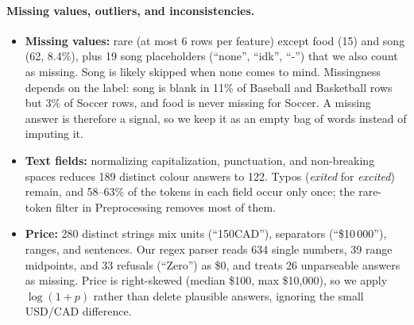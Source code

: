 \documentclass[11pt,letterpaper]{article}
\begin{document}
\paragraph{Missing values, outliers, and inconsistencies.}
\begin{itemize}
\item \textbf{Missing values:} rare (at most 6 rows per feature) except food (15)
and song (62, 8.4\%), plus 19 song placeholders (``none'', ``idk'', ``-'') that we
also count as missing. Song is likely skipped when none comes to mind. Missingness
depends on the label: song is blank in 11\% of Baseball and Basketball rows but 3\%
of Soccer rows, and food is never missing for Soccer. A missing answer is therefore
a signal, so we keep it as an empty bag of words instead of imputing it.
\item \textbf{Text fields:} normalizing capitalization, punctuation, and
non-breaking spaces reduces 189 distinct colour answers to 122. Typos
(\emph{exited} for \emph{excited}) remain, and 58--63\% of the tokens in each field
occur only once; the rare-token filter in Preprocessing removes most of them.
\item \textbf{Price:} 280 distinct strings mix units (``150CAD''), separators
(``\$10\,000''), ranges, and sentences. Our regex parser reads 634 single
numbers, 39 range midpoints, and 33 refusals (``Zero'') as \$0, and treats 26
unparseable answers as missing. Price is right-skewed (median \$100, max
\$10{,}000), so we apply $\log(1+p)$ rather than delete plausible answers,
ignoring the small USD/CAD difference.
\end{itemize}
\end{document}
